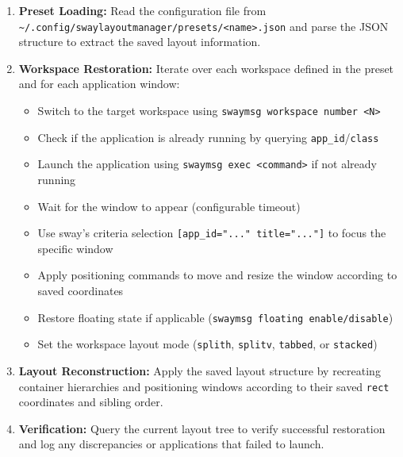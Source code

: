 \begin{enumerate}
    \item \textbf{Preset Loading:} Read the configuration file from \texttt{\~{}/.config/swaylayoutmanager/presets/<name>.json} and parse the JSON structure to extract the saved layout information.
    \item \textbf{Workspace Restoration:} Iterate over each workspace defined in the preset and for each application window:
    \begin{itemize}
        \item Switch to the target workspace using \texttt{swaymsg workspace number <N>}
        \item Check if the application is already running by querying \texttt{app\_id}/\texttt{class}
        \item Launch the application using \texttt{swaymsg exec <command>} if not already running
        \item Wait for the window to appear (configurable timeout)
        \item Use sway's criteria selection \texttt{[app\_id="..." title="..."]} to focus the specific window
        \item Apply positioning commands to move and resize the window according to saved coordinates
        \item Restore floating state if applicable (\texttt{swaymsg floating enable/disable})
        \item Set the workspace layout mode (\texttt{splith}, \texttt{splitv}, \texttt{tabbed}, or \texttt{stacked})
    \end{itemize}
    \item \textbf{Layout Reconstruction:} Apply the saved layout structure by recreating container hierarchies and positioning windows according to their saved \texttt{rect} coordinates and sibling order.
    \item \textbf{Verification:} Query the current layout tree to verify successful restoration and log any discrepancies or applications that failed to launch.
\end{enumerate}

